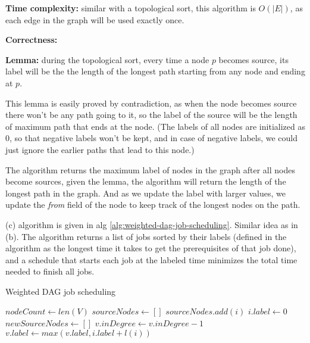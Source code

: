 \documentclass{article}
\begin{document}
\begin{description}
\begin{algorithm}[h]
\begin{algorithmic}[1]
    \end{algorithmic}
  \end{algorithm}

  \textbf{Time complexity:} similar with a topological sort, this algorithm is $O(|E|)$, as each edge in the graph will be used exactly once.

  \textbf{Correctness:} 

  \textbf{Lemma:} during the topological sort, every time a node $p$ becomes source, its label will be the the length of the longest path starting from any node and ending at $p$. 

  This lemma is easily proved by contradiction, as when the node becomes source there won't be any path going to it, so the label of the source will be the length of maximum path that ends at the node. (The labels of all nodes are initialized as 0, so that negative labels won't be kept, and in case of negative labels, we could just ignore the earlier paths that lead to this node.)

  The algorithm returns the maximum label of nodes in the graph after all nodes become sources, given the lemma, the algorithm will return the length of the longest path in the graph. And as we update the label with larger values, we update the \textit{from} field of the node to keep track of the longest nodes on the path.

  (c) algorithm is given in alg \ref{alg:weighted-dag-job-scheduling}. Similar idea as in (b). The algorithm returns a list of jobs sorted by their labels (defined in the algorithm as the longest time it takes to get the prerequisites of that job done), and a schedule that starts each job at the labeled time minimizes the total time needed to finish all jobs.

  \begin{algorithm}[h]
  \caption{Weighted DAG job scheduling}
  \label{alg:weighted-dag-job-scheduling}
    \begin{algorithmic}[1]
  
      \State $nodeCount \gets len(V)$
      \State $sourceNodes \gets []$
          \State $sourceNodes.add(i)$
          \State $i.label \gets 0$
        \EndIf
      \EndFor
        \State $newSourceNodes \gets []$
            \State $v.inDegree \gets v.inDegree - 1$
            \State $v.label \gets max(v.label, i.label + l(i))$
            

\end{algorithmic}
\end{algorithm}
\end{description}
\end{document}
